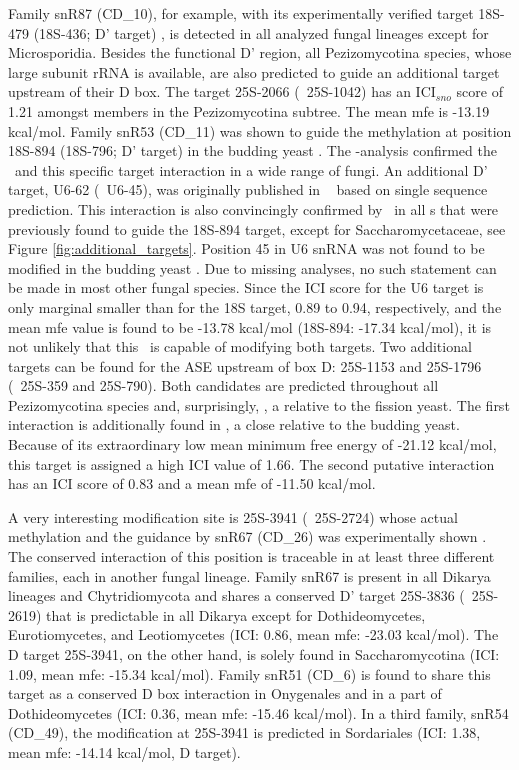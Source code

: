 Family snR87 (CD\_10), for example, with its experimentally verified
target 18S-479 (18S-436; D' target) \cite{Davis:2006}, is detected in
all analyzed fungal lineages except for Microsporidia. Besides the
functional D' region, all Pezizomycotina species, whose large subunit
rRNA is available, are also predicted to guide an additional target
upstream of their D box. The target 25S-2066 (\ncr\ 25S-1042) has an
ICI$_{sno}$ score of 1.21 amongst members in the Pezizomycotina
subtree. The mean mfe is -13.19 kcal/mol.  Family snR53 (CD\_11) was
shown to guide the methylation at position 18S-894 (18S-796; D'
target) in the budding yeast \cite{Lowe:1999}. The \snostrip-analysis
confirmed the \sno\ and this specific target interaction in a wide
range of fungi. An additional D' target, U6-62 (\sce\ U6-45), was
originally published in \ncr\ \cite{Liu:2009} based on single sequence
prediction. This interaction is also convincingly confirmed by
\snostrip\ in all \sno s that were previously found to guide the
18S-894 target, except for Saccharomycetaceae, see Figure
\ref{fig:additional_targets}. Position 45 in U6 snRNA was not found to
be modified in the budding yeast \cite{Machnicka:2013,
  Massenet:1998}. Due to missing analyses, no such statement can be
made in most other fungal species. Since the ICI score for the U6
target is only marginal smaller than for the 18S target, 0.89 to 0.94,
respectively, and the mean mfe value is found to be -13.78 kcal/mol
(18S-894: -17.34 kcal/mol), it is not unlikely that this \sno\ is
capable of modifying both targets. Two additional targets can be found
for the ASE upstream of box D: 25S-1153 and 25S-1796 (\ncr\ 25S-359
and 25S-790). Both candidates are predicted throughout all
Pezizomycotina species and, surprisingly, \Tde, a relative to the
fission yeast. The first interaction is additionally found in \Yli, a
close relative to the budding yeast. Because of its extraordinary low
mean minimum free energy of -21.12 kcal/mol, this target is assigned a
high ICI value of 1.66. The second putative interaction has an ICI
score of 0.83 and a mean mfe of -11.50 kcal/mol.

A very interesting modification site is 25S-3941 (\sce\ 25S-2724)
whose actual methylation and the guidance by snR67 (CD\_26) was
experimentally shown \cite{Lowe:1999}. The conserved interaction of
this position is traceable in at least three different families, each
in another fungal lineage. Family snR67 is present in all Dikarya
lineages and Chytridiomycota and shares a conserved D' target 25S-3836
(\sce\ 25S-2619) that is predictable in all Dikarya except for
Dothideomycetes, Eurotiomycetes, and Leotiomycetes (ICI: 0.86, mean
mfe: -23.03 kcal/mol). The D target 25S-3941, on the other hand, is
solely found in Saccharomycotina (ICI: 1.09, mean mfe: -15.34
kcal/mol). Family snR51 (CD\_6) is found to share this target as a
conserved D box interaction in Onygenales and in a part of
Dothideomycetes (ICI: 0.36, mean mfe: -15.46 kcal/mol). In a third
family, snR54 (CD\_49), the modification at 25S-3941 is predicted in
Sordariales (ICI: 1.38, mean mfe: -14.14 kcal/mol, D target).

